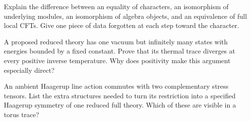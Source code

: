 \begin{exercise}\label{ex:sewing-object}
Explain the difference between an equality of characters, an
isomorphism of underlying modules, an isomorphism of algebra
objects, and an equivalence of full local CFTs. Give one piece
of data forgotten at each step toward the character.

\par\smallskip{}\par
\end{exercise}

\begin{exercise}\label{ex:sewing-coset}
A proposed reduced theory has one vacuum but infinitely many
states with energies bounded by a fixed constant. Prove that
its thermal trace diverges at every positive inverse temperature.
Why does positivity make this argument especially direct?

\par\smallskip{}\par
\end{exercise}

\begin{exercise}\label{ex:sewing-descent}
An ambient Haagerup line action commutes with two complementary
stress tensors. List the extra structures needed to turn its
restriction into a specified Haagerup symmetry of one reduced
full theory. Which of these are visible in a torus trace?

\par\smallskip{}\par
\end{exercise}
